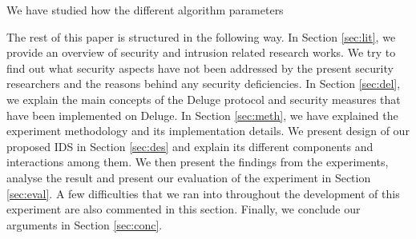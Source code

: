 \documentclass[conference,final]{IEEEtran}
\begin{document}
We have studied how the different  algorithm parameters %









%
The rest of this paper is structured in the following way. In Section \ref{sec:lit}, we  provide an overview of security and intrusion related research works.
We try to find out what security aspects have not been addressed by the present  security researchers and the reasons behind any security deficiencies.
In Section \ref{sec:del}, we explain the main concepts of the Deluge protocol and security measures that have been implemented on Deluge. 
In Section \ref{sec:meth}, we have explained the experiment methodology and its implementation details.
We present design of our proposed IDS in Section \ref{sec:des} and explain its different components and interactions among them. 
We then present the findings from the experiments, analyse the result and present our evaluation of the experiment in Section \ref{sec:eval}. A few difficulties that we ran into throughout the development of this experiment are also commented in this section. 
Finally, we conclude our arguments in Section \ref{sec:conc}.
%
\end{document}
